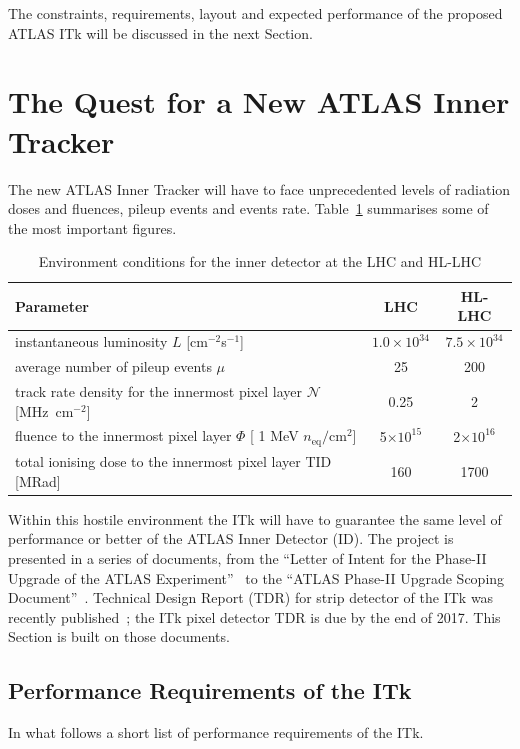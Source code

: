 The constraints, requirements, layout and expected performance of the proposed ATLAS ITk will 
be discussed in the next Section.

\section{The Quest for a New ATLAS Inner Tracker}
\label{sec:NewTracker}

The new ATLAS  Inner Tracker will have to face unprecedented levels of radiation doses and fluences, 
pileup events and events rate. Table~\ref{tab:ITkConditions} summarises some of the most important figures.

\begin{table}[!htpb]
\centering
\caption{\label{tab:ITkConditions}Environment conditions for the inner detector at the LHC and HL-LHC}
\begin{tabular}{lcc}
\hline
Parameter & LHC & HL-LHC \\
\hline
\hline
instantaneous luminosity $L$	 [cm$^{-2}$s$^{-1}$] & $1.0\times10^{34}$ &  $7.5\times10^{34}$ \\
average number of pileup events $\mu$ & 25 & 200\\
track rate density for the innermost pixel layer $\mathcal{N}$ [MHz~cm$^{-2}$] & 0.25 & 2 \\ 
fluence to the innermost pixel layer $\Phi$ [ 1 MeV $n_\text{eq}/\text{cm}^2$] & 5$\times10^{15}$ & 2$\times10^{16}$ \\
total ionising dose to the innermost pixel layer TID [MRad] & 160  & 1700 \\
\hline
\end{tabular}
\end{table}

Within this hostile environment the ITk will have to guarantee the same level of performance  or better 
of the ATLAS Inner Detector (ID).
The project is presented  in a series of documents, from the ``Letter of Intent for the Phase-II Upgrade of the ATLAS Experiment''~\cite{ATLASLoIPhaseII} to the ``ATLAS Phase-II Upgrade Scoping Document''~\cite{ATLASITkScopingDocument}. Technical Design Report (TDR) for strip detector of the 
ITk was recently published~\cite{ITkStripsTDR}; the ITk pixel detector TDR is due by the end of 2017.
This Section is built on those documents.




\subsection{Performance Requirements of the ITk}
In what follows a short list of performance requirements of the ITk.

